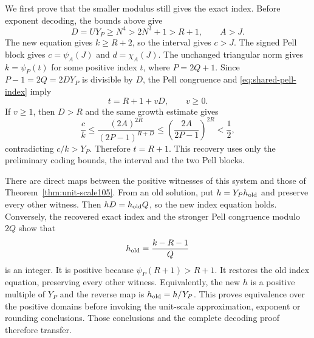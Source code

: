 We first prove that the smaller modulus still gives the exact index.
Before exponent decoding, the bounds above give
\[
 D=UY_P\ge N^4>2N^3+1>R+1,\qquad A>J.
\]
The new equation gives $k\ge R+2$, so the interval gives $c>J$.
The signed Pell block gives $c=\psi_A(J)$ and $d=\chi_A(J)$.
The unchanged triangular norm gives $k=\psi_P(t)$ for some
positive index $t$, where $P=2Q+1$. Since
$P-1=2Q=2DY_P$ is divisible by $D$, the Pell congruence and
\eqref{eq:shared-pell-index} imply
\[
 t=R+1+vD,\qquad v\ge0.
\]
If $v\ge1$, then $D>R$ and the same growth estimate gives
\[
 \frac ck\le\frac{(2A)^{2R}}{(2P-1)^{R+D}}
 \le\left(\frac{2A}{2P-1}\right)^{2R}<\frac12,
\]
contradicting $c/k>Y_P$. Therefore $t=R+1$.
This recovery uses only the preliminary coding bounds, the interval
and the two Pell blocks.

There are direct maps between the positive witnesses of this system
and those of Theorem~\ref{thm:unit-scale105}. From an old solution,
put $h=Y_Ph_{\rm old}$ and preserve every other witness. Then
$hD=h_{\rm old}Q$, so the new index equation holds.
Conversely, the recovered exact index and the stronger Pell congruence
modulo $2Q$ show that
\[
 h_{\rm old}=\frac{k-R-1}{Q}
\]
is an integer. It is positive because $\psi_P(R+1)>R+1$.
It restores the old index equation, preserving every other witness.
Equivalently, the new $h$ is a positive multiple of $Y_P$ and the
reverse map is $h_{\rm old}=h/Y_P$.
This proves equivalence over the positive domains before invoking
the unit-scale approximation, exponent or rounding conclusions.
Those conclusions and the complete decoding proof therefore transfer.

